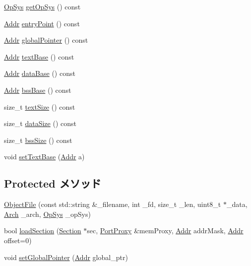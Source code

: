 \begin{DoxyCompactItemize}
\hyperlink{classObjectFile_aafc438343baf22e5884dde40c41331e8}{OpSys} \hyperlink{classObjectFile_a5235adbd87201760b27541a439a96254}{getOpSys} () const 
\item 
\hyperlink{base_2types_8hh_af1bb03d6a4ee096394a6749f0a169232}{Addr} \hyperlink{classObjectFile_a9f08cb3194ccbdd03293d351e149c9ac}{entryPoint} () const 
\item 
\hyperlink{base_2types_8hh_af1bb03d6a4ee096394a6749f0a169232}{Addr} \hyperlink{classObjectFile_aa83734f26b4c275bac69715b9fbcc35d}{globalPointer} () const 
\item 
\hyperlink{base_2types_8hh_af1bb03d6a4ee096394a6749f0a169232}{Addr} \hyperlink{classObjectFile_a39d861e1995f538cbc2cdb860602b36e}{textBase} () const 
\item 
\hyperlink{base_2types_8hh_af1bb03d6a4ee096394a6749f0a169232}{Addr} \hyperlink{classObjectFile_a08072d959ffdf2624181b55cd9d1450d}{dataBase} () const 
\item 
\hyperlink{base_2types_8hh_af1bb03d6a4ee096394a6749f0a169232}{Addr} \hyperlink{classObjectFile_a9aeb851c40011850f45b34cdd60aada9}{bssBase} () const 
\item 
size\_\-t \hyperlink{classObjectFile_afd33bc083adc1815b4e5daf6739e248d}{textSize} () const 
\item 
size\_\-t \hyperlink{classObjectFile_a71a8a324d6ab3da19c74380f2f264033}{dataSize} () const 
\item 
size\_\-t \hyperlink{classObjectFile_af1e935fb177f10df6fd2d752a2c0abc8}{bssSize} () const 
\item 
void \hyperlink{classObjectFile_a94b9967a6f94e8ea6fee38d6ae664405}{setTextBase} (\hyperlink{base_2types_8hh_af1bb03d6a4ee096394a6749f0a169232}{Addr} a)
\end{DoxyCompactItemize}
\subsection*{Protected メソッド}
\begin{DoxyCompactItemize}
\item 
\hyperlink{classObjectFile_a12e93d714650071eab585e1f54ba0348}{ObjectFile} (const std::string \&\_\-filename, int \_\-fd, size\_\-t \_\-len, uint8\_\-t $\ast$\_\-data, \hyperlink{classObjectFile_a0ac03ab06a859320a9072002bdf3aa0f}{Arch} \_\-arch, \hyperlink{classObjectFile_aafc438343baf22e5884dde40c41331e8}{OpSys} \_\-opSys)
\item 
bool \hyperlink{classObjectFile_aa7e7fd749b6ba3ce19c7d5a3032d890c}{loadSection} (\hyperlink{structObjectFile_1_1Section}{Section} $\ast$sec, \hyperlink{classPortProxy}{PortProxy} \&memProxy, \hyperlink{base_2types_8hh_af1bb03d6a4ee096394a6749f0a169232}{Addr} addrMask, \hyperlink{base_2types_8hh_af1bb03d6a4ee096394a6749f0a169232}{Addr} offset=0)
\item 
void \hyperlink{classObjectFile_a31ebe109c735ee4f1460edce76d98426}{setGlobalPointer} (\hyperlink{base_2types_8hh_af1bb03d6a4ee096394a6749f0a169232}{Addr} global\_\-ptr)
\end{DoxyCompactItemize}
